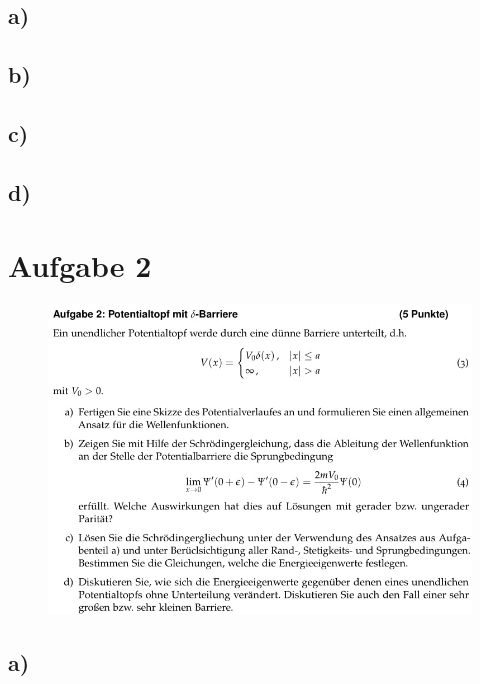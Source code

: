     \subsection{a)}

    \subsection{b)}

    \subsection{c)}

    \subsection{d)}

\section{Aufgabe 2}

    \begin{figure}
        \centering
        \includegraphics[width=\textwidth]{images/Aufgabe2.jpg}
        \label{fig:2}
    \end{figure}

    \subsection{a)}


